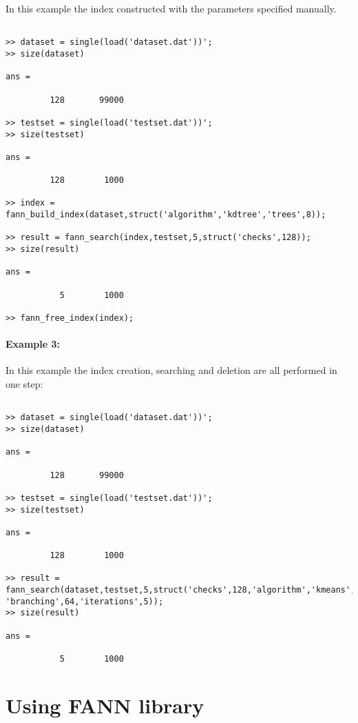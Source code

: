 \documentclass[letter,10pt]{article}
\begin{document}
In this example the index constructed with the parameters specified manually.

\begin{Verbatim}[fontsize=\footnotesize,frame=single]

>> dataset = single(load('dataset.dat'))';
>> size(dataset)

ans =

         128       99000

>> testset = single(load('testset.dat'))';
>> size(testset)

ans =

         128        1000

>> index = fann_build_index(dataset,struct('algorithm','kdtree','trees',8));

>> result = fann_search(index,testset,5,struct('checks',128));
>> size(result)

ans =

           5        1000

>> fann_free_index(index);

\end{Verbatim}

\paragraph{Example 3:}

In this example the index creation, searching and deletion are all performed in one step:

\begin{Verbatim}[fontsize=\footnotesize,frame=single]

>> dataset = single(load('dataset.dat'))';
>> size(dataset)

ans =

         128       99000

>> testset = single(load('testset.dat'))';
>> size(testset)

ans =

         128        1000

>> result = fann_search(dataset,testset,5,struct('checks',128,'algorithm','kmeans',
'branching',64,'iterations',5));
>> size(result)

ans =

           5        1000

\end{Verbatim}

\section{Using FANN library}
\end{document}
